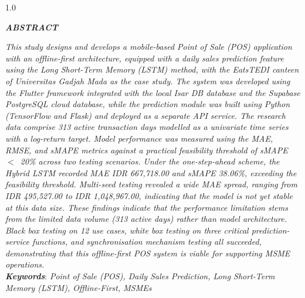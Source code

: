 \documentclass[12pt, a4paper, onecolumn, oneside]{report}
\begin{document}
\newpage
{}
{}
\begin{spacing}{1.0}
\begin{center}
    \textbf{\textit{ABSTRACT}}\\[0.5cm]
\end{center}

\noindent \textit{This study designs and develops a mobile-based Point of Sale (POS) application with an offline-first architecture, equipped with a daily sales prediction feature using the Long Short-Term Memory (LSTM) method, with the EatsTEDI canteen of Universitas Gadjah Mada as the case study. The system was developed using the Flutter framework integrated with the local Isar DB database and the Supabase PostgreSQL cloud database, while the prediction module was built using Python (TensorFlow and Flask) and deployed as a separate API service. The research data comprise 313 active transaction days modelled as a univariate time series with a log-return target. Model performance was measured using the MAE, RMSE, and sMAPE metrics against a practical feasibility threshold of sMAPE~$<$~20\% across two testing scenarios. Under the one-step-ahead scheme, the Hybrid LSTM recorded MAE IDR 667,718.00 and sMAPE 38.06\%, exceeding the feasibility threshold. Multi-seed testing revealed a wide MAE spread, ranging from IDR 495,527.00 to IDR 1,048,967.00, indicating that the model is not yet stable at this data size. These findings indicate that the performance limitation stems from the limited data volume (313 active days) rather than model architecture. Black box testing on 12 use cases, white box testing on three critical prediction-service functions, and synchronisation mechanism testing all succeeded, demonstrating that this offline-first POS system is viable for supporting MSME operations.}\\[0.6cm]

\noindent \textbf{\textit{Keywords}}: \textit{Point of Sale (POS), Daily Sales Prediction, Long Short-Term Memory (LSTM), Offline-First, MSMEs}
\end{spacing}

\newpage

\renewcommand{\contentsname}{}
\renewcommand{\listfigurename}{}
\renewcommand{\listtablename}{}
\end{document}
